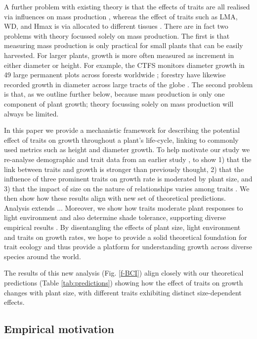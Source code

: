 \documentclass[12pt, a4paper]{article}
\begin{document}
A further problem with existing theory is that the effects of traits are all
realised via influences on mass production \citep{enquist-2007},
whereas the effect of traits such as LMA, WD, and Hmax is via allocated
to different tissues \citep{falster-2011}. There are in fact two problems with theory
focussed solely on mass production. The first is that measuring mass
production is only practical for small plants that can be easily harvested.
For larger plants, growth is more often measured as increment in either diameter
or height. For example, the CTFS monitors diameter growth in 49 large permanent
plots across forests worldwide \citep{anderson-teixeira-2015};
 forestry have likewise recorded growth in diameter across
large tracts of the globe \citep{purves-2008}. The second problem is
that, as we outline further below, because mass production is only one
component of plant growth; theory focussing solely on mass production will
 always be limited.

In this paper we provide a mechanistic framework for describing the potential
effect of traits on growth throughout a plant's life-cycle, linking to
commonly used metrics such as height and diameter growth. To help motivate our
study we re-analyse demographic and trait data from an earlier study
 \citep{wright-2010}, to show 1) that the link between traits and
growth is stronger than previously thought, 2) that the influence of three
prominent traits on growth rate is moderated by plant size, and 3) that the
impact of size on the nature of relationships varies among traits
 \citep[see also]{ruger-2012}. We then show how these results align with new
set of theoretical predictions. Analysis extends ...
Moreover, we show how traits moderate plant
responses to light environment and also determine shade tolerance, supporting
diverse empirical results \citep{ruger-2012, poorter-2006}. By
disentangling the effects of plant size, light environment and traits on
growth rates, we hope to provide a solid theoretical foundation for trait
ecology and thus provide a platform for understanding growth across diverse
species around the world.


The results of this new analysis
(Fig. \ref{f-BCI}) align closely with our theoretical predictions (Table
\ref{tab:predictions}) showing how the effect of traits on growth
changes with plant size, with different traits exhibiting distinct
size-dependent effects.



\subsection{Empirical motivation}\label{fresh-empirical-motivation}
\end{document}
